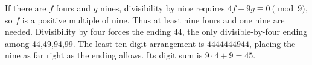 If there are $f$ fours and $g$ nines, divisibility by nine requires $4f+9g\equiv0\pmod9$, so $f$ is a positive multiple of nine. Thus at least nine fours and one nine are needed. Divisibility by four forces the ending 44, the only divisible-by-four ending among 44,49,94,99. The least ten-digit arrangement is $4444444944$, placing the nine as far right as the ending allows. Its digit sum is $9\cdot4+9=\boxed{45}$.
